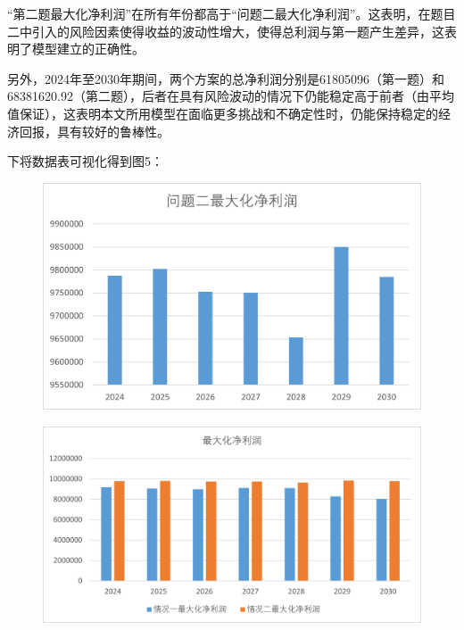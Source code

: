 \documentclass{cumcmthesis}
\begin{document}
“第二题最大化净利润”在所有年份都高于“问题二最大化净利润”。这表明，在题目二中引入的风险因素使得收益的波动性增大，使得总利润与第一题产生差异，这表明了模型建立的正确性。

另外，2024年至2030年期间，两个方案的总净利润分别是61805096（第一题）和68381620.92（第二题），后者在具有风险波动的情况下仍能稳定高于前者（由平均值保证），这表明本文所用模型在面临更多挑战和不确定性时，仍能保持稳定的经济回报，具有较好的鲁棒性。

下将数据表可视化得到图5：

\begin{figure}[H]
    \centering
    \begin{minipage}{0.49\textwidth}  %
        \centering
        \includegraphics[width=0.9\linewidth]{4.png}  %
        \label{fig:profit_case2}
    \end{minipage}\hfill  %
    \begin{minipage}{0.49\textwidth}  %
        \centering
        \includegraphics[width=0.9\linewidth]{5.png}  %
        \label{fig:profit_case2_1_1}
    \end{minipage}
    \caption{}
\end{figure}
\end{document}
